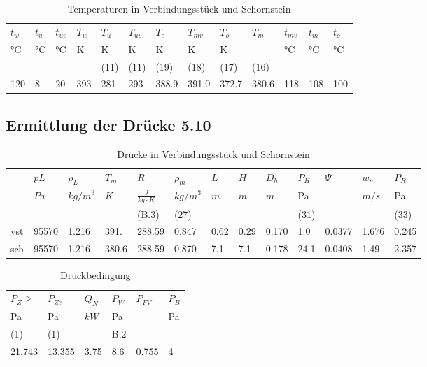 \documentclass[a4paper,10pt,twoside]{article}
\begin{document}
\begin{landscape}
\begin{table}[htbp]
\caption{\label{tab:org343df5e}
Temperaturen in Verbindungsstück und Schornstein}
\centering
\begin{tabular}{lllllllllllll}
\(t_w\) & \(t_u\) & \(t_{uv}\) & \(T_w\) & \(T_u\) & \(T_{uv}\) & \(T_e\) & \(T_{mv}\) & \(T_o\) & \(T_m\) & \(t_{mv}\) & \(t_m\) & \(t_o\)\\
°C & °C & °C & K & K & K & K & K & K &  & °C & °C & °C\\
 &  &  &  & (11) & (11) & (19) & (18) & (17) & (16) &  &  & \\
\hline
120 & 8 & 20 & 393 & 281 & 293 & 388.9 & 391.0 & 372.7 & 380.6 & 118 & 108 & 100\\
\end{tabular}
\end{table}

\end{landscape}

\subsection{Ermittlung der Drücke 5.10}
\label{sec:org4364a82}
\begin{table}[htbp]
\caption{\label{tab:orgd900499}
Drücke in Verbindungsstück und Schornstein}
\centering
\begin{tabular}{lllllllllllll}
 & \(pL\) & \(\rho_L\) & \(T_m\) & \(R\) & \(\rho_m\) & \(L\) & \(H\) & \(D_h\) & \(P_H\) & \(\Psi\) & \(w_m\) & \(P_R\)\\
 & \(Pa\) & \(kg/m^3\) & \(K\) & \(\frac{J}{kg\cdot K}\) & \(kg/m^3\) & \(m\) & \(m\) & \(m\) & Pa &  & \(m/s\) & Pa\\
 &  &  &  & (B.3) & (27) &  &  &  & (31) &  &  & (33)\\
\hline
vst & 95570 & 1.216 & 391. & 288.59 & 0.847 & 0.62 & 0.29 & 0.170 & 1.0 & 0.0377 & 1.676 & 0.245\\
sch & 95570 & 1.216 & 380.6 & 288.59 & 0.870 & 7.1 & 7.1 & 0.178 & 24.1 & 0.0408 & 1.49 & 2.357\\
\end{tabular}
\end{table}

\begin{table}[htbp]
\caption{Druckbedingung}
\centering
\begin{tabular}{llllll}
\(P_Z\ge\) & \(P_{Ze}\) & \(Q_N\) & \(P_W\) & \(P_{FV}\) & \(P_B\)\\
Pa & Pa & \(kW\) & Pa &  & Pa\\
(1) & (1) &  & B.2 &  & \\
\hline
21.743 & 13.355 & 3.75 & 8.6 & 0.755 & 4\\
\end{tabular}
\end{table}
\end{document}
